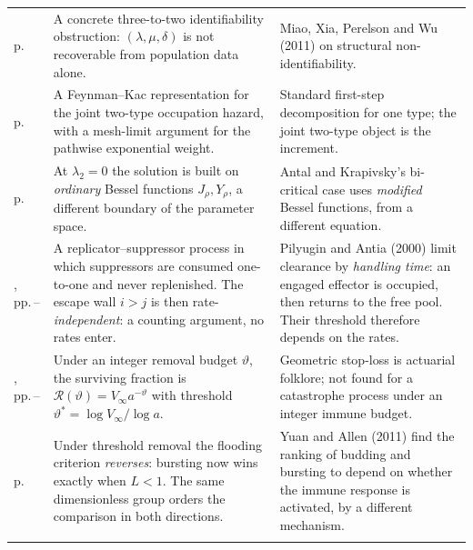 {\begin{xltabular}{\linewidth}{@{}>{\raggedright\arraybackslash}p{20mm}O>{\raggedright\arraybackslash}p{40mm}@{}}
\newline p.\,\pageref{p:sec:identifiability} &
A concrete three-to-two identifiability obstruction: $(\lambda,\mu,\delta)$ is not
recoverable from population data alone. &
Miao, Xia, Perelson and Wu (2011) on structural non-identifiability. \\
\addlinespace[3pt]

\newline p.\,\pageref{prop:feynman-kac} &
A Feynman--Kac representation for the joint two-type occupation hazard, with a mesh-limit
argument for the pathwise exponential weight. &
Standard first-step decomposition for one type; the joint two-type object is the increment. \\
\addlinespace[3pt]

\newline p.\,\pageref{prop:lambda2-zero} &
At $\lambda_2=0$ the solution is built on \emph{ordinary} Bessel functions
$J_\rho,Y_\rho$, a different boundary of the parameter space. &
Antal and Krapivsky's bi-critical case uses \emph{modified} Bessel functions, from a
different equation. \\
\addlinespace[3pt]

, \newline pp.\,\pageref{path:def:rs}--\pageref{path:prop:certainty} &
A replicator--suppressor process in which suppressors are consumed one-to-one and never
replenished. The escape wall $i>j$ is then rate-\emph{independent}: a counting argument, no
rates enter. &
Pilyugin and Antia (2000) limit clearance by \emph{handling time}: an engaged effector is
occupied, then returns to the free pool. Their threshold therefore depends on the rates. \\
\addlinespace[3pt]

, \newline pp.\,\pageref{path:prop:ratio}--\pageref{path:cor:threshold} &
Under an integer removal budget $\vartheta$, the surviving fraction is
$\mathcal{R}(\vartheta)=V_\infty a^{-\vartheta}$ with threshold
$\vartheta^\ast=\log V_\infty/\log a$. &
Geometric stop-loss is actuarial folklore; not found for a catastrophe process under an
integer immune budget. \\
\addlinespace[3pt]

\newline p.\,\pageref{path:prop:reversal} &
Under threshold removal the flooding criterion \emph{reverses}: bursting now wins exactly
when $L<1$. The same dimensionless group orders the comparison in both directions. &
Yuan and Allen (2011) find the ranking of budding and bursting to depend on whether the immune
response is activated, by a different mechanism. \\
\addlinespace[3pt]


\end{xltabular}}

